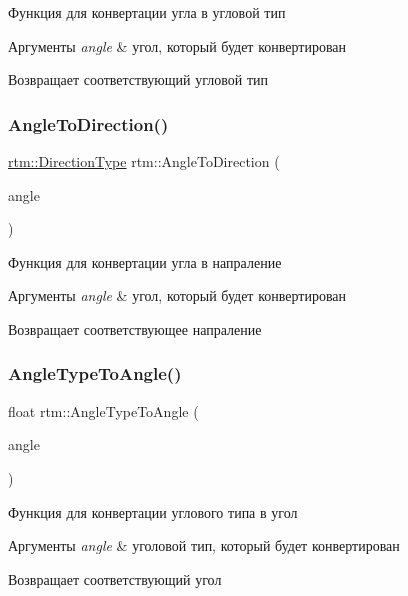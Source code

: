 Функция для конвертации угла в угловой тип 
\begin{DoxyParams}{Аргументы}
{\em angle} & угол, который будет конвертирован \\
\hline
\end{DoxyParams}
\begin{DoxyReturn}{Возвращает}
соответствующий угловой тип 
\end{DoxyReturn}
\mbox{\label{namespacertm_ac81b2243a62081233f7b549248b5a145}} 
\subsubsection{\texorpdfstring{Angle\+To\+Direction()}{AngleToDirection()}}
{\footnotesize\ttfamily \hyperlink{namespacertm_a57b216f3aeb45041f3461bab08bc3aeb}{rtm\+::\+Direction\+Type} rtm\+::\+Angle\+To\+Direction (\begin{DoxyParamCaption}\item[{float}]{angle }\end{DoxyParamCaption})}

Функция для конвертации угла в напраление 
\begin{DoxyParams}{Аргументы}
{\em angle} & угол, который будет конвертирован \\
\hline
\end{DoxyParams}
\begin{DoxyReturn}{Возвращает}
соответствующее напраление 
\end{DoxyReturn}
\mbox{\label{namespacertm_ad13b014bcdda27e0ff2fb23f265e29e4}} 
\subsubsection{\texorpdfstring{Angle\+Type\+To\+Angle()}{AngleTypeToAngle()}}
{\footnotesize\ttfamily float rtm\+::\+Angle\+Type\+To\+Angle (\begin{DoxyParamCaption}\item[{\hyperlink{namespacertm_a69dc82b16a0148c10962caa83d930f89}{Angle\+Type}}]{angle }\end{DoxyParamCaption})}

Функция для конвертации углового типа в угол 
\begin{DoxyParams}{Аргументы}
{\em angle} & уголовой тип, который будет конвертирован \\
\hline
\end{DoxyParams}
\begin{DoxyReturn}{Возвращает}
соответствующий угол 
\end{DoxyReturn}
\mbox{\label{namespacertm_abeb9a79e27bc0c8c4c3e6cd9ec802627}} 
